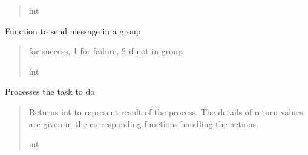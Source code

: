 \documentclass[letterpaper,10pt,english]{sphinxmanual}
\begin{document}
\begin{fulllineitems}
\begin{fulllineitems}
\begin{quote}
\begin{description}
\sphinxAtStartPar
int

\end{description}\end{quote}

\end{fulllineitems}


\begin{fulllineitems}
\label{\detokenize{Message:Message.Message._send_message_in_group}}
\pysigstartsignatures
{}
\pysigstopsignatures
\sphinxAtStartPar
Function to send message in a group
\begin{quote}\begin{description}
 for success, 1 for failure, 2 if not in group

\sphinxAtStartPar
int

\end{description}\end{quote}

\end{fulllineitems}


\begin{fulllineitems}
\label{\detokenize{Message:Message.Message.processTask}}
\pysigstartsignatures
{}
\pysigstopsignatures
\sphinxAtStartPar
Processes the task to do
\begin{quote}\begin{description}
\sphinxAtStartPar
Returns int to represent result of the process. The details of return values are given in the corresponding functions handling the actions.

\sphinxAtStartPar
int

\end{description}\end{quote}

\end{fulllineitems}


\end{fulllineitems}
\end{document}
